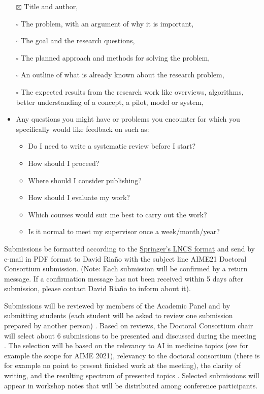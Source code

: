 \documentclass[runningheads]{llncs}
\begin{document}
\begin{itemize}
\item[$\boxtimes$]
  Title and author,
\item[$\square$]
  The problem, with an argument of why it is important,
\item[$\square$]
  The goal and the research questions,
\item[$\square$]
  The planned approach and methods for solving the problem,
\item[$\square$]
  An outline of what is already known about the research problem,
\item[$\square$]
  The expected results from the research work like overviews,
  algorithms, better understanding of a concept, a pilot, model or
  system,
\item
  Any questions you might have or problems you encounter for which you
  specifically would like feedback on such as:

  \begin{itemize}
  \item
    Do I need to write a systematic review before I start?
  \item
    How should I proceed?
  \item
    Where should I consider publishing?
  \item
    How should I evaluate my work?
  \item
    Which courses would suit me best to carry out the work?
  \item
    Is it normal to meet my supervisor once a week/month/year?
  \end{itemize}
\end{itemize}

Submissions be formatted according to the
\href{http://www.springer.de/comp/lncs/authors.html}{Springer's LNCS
format} and send by e-mail in PDF format to David Riaño with the subject
line AIME21 Doctoral Consortium submission. (Note: Each submission will
be confirmed by a return message. If a confirmation message has not been
received within 5 days after submission, please contact David Riaño to
inform about it).

Submissions will be reviewed by members of the Academic Panel and by
submitting students (each student will be asked to review one submission
prepared by another person) . Based on reviews, the Doctoral Consortium
chair will select about 6 submissions to be presented and discussed
during the meeting . The selection will be based on the relevancy to AI
in medicine topics (see for example the scope for AIME 2021), relevancy
to the doctoral consortium (there is for example no point to present
finished work at the meeting), the clarity of writing, and the resulting
spectrum of presented topics . Selected submissions will appear in
workshop notes that will be distributed among conference participants.
\end{document}
